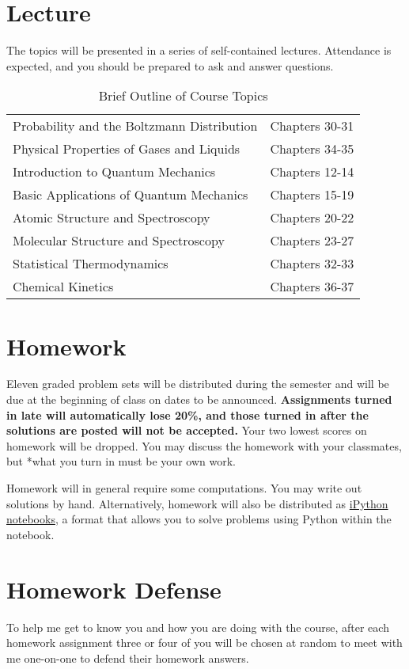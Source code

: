 \documentclass[11pt]{article}
\begin{document}
\section{Lecture}
\label{sec:org4a94aa6}
The topics will be presented in a series of self-contained
lectures. Attendance is expected, and you should be prepared to ask
and answer questions.  

\begin{table}[htbp]
\caption{Brief Outline of Course Topics}
\centering
\begin{tabular}{ll}
\hline
Probability and the Boltzmann Distribution & Chapters 30-31\\
Physical Properties of Gases and Liquids & Chapters 34-35\\
Introduction to Quantum Mechanics & Chapters 12-14\\
Basic Applications of Quantum Mechanics & Chapters 15-19\\
Atomic Structure and Spectroscopy & Chapters 20-22\\
Molecular Structure and Spectroscopy & Chapters 23-27\\
Statistical Thermodynamics & Chapters 32-33\\
Chemical Kinetics & Chapters 36-37\\
\hline
\end{tabular}
\end{table}

\section{Homework}
\label{sec:orgdb16001}
Eleven graded problem sets will be distributed during the semester and will be due at the beginning of class on dates to be announced.  \textbf{Assignments turned in late will automatically lose 20\%, and those turned in after the solutions are posted will not be accepted.}  Your two lowest scores on homework will be dropped.  You may discuss the homework with your classmates, but *what you turn in must be your own work.

Homework will in general require some computations. You may write out solutions by hand. Alternatively, homework will also be distributed as \href{https://ipython.org/notebook.html}{iPython notebooks}, a format that allows you to solve problems using Python within the notebook.
\section{Homework Defense}
\label{sec:org96983bf}
To help me get to know you and how you are doing with the course, after each homework assignment three or four of you will be chosen at random to meet with me one-on-one to defend their homework answers.
\end{document}
